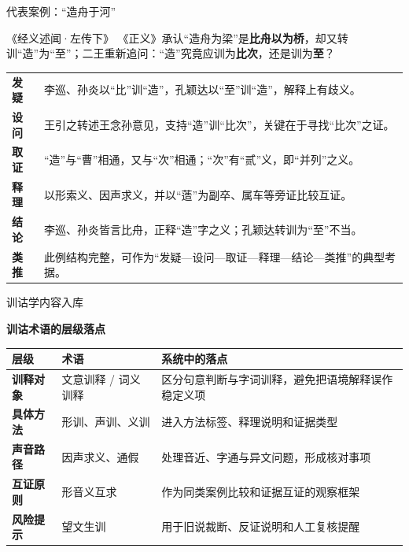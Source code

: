 \documentclass[aspectratio=169]{beamer}
\newcommand{\key}[1]{\textcolor{rucRed}{\textbf{#1}}}
\begin{document}
\begin{frame}{代表案例：“造舟于河”}
    \small
    \begin{block}{《经义述闻·左传下》}
        《正义》承认“造舟为梁”是\key{比舟以为桥}，却又转训“造”为“至”；二王重新追问：“造”究竟应训为\key{比次}，还是训为\key{至}？
    \end{block}

    \vspace{0.15cm}

    {
    \renewcommand{\arraystretch}{1.20}
    \begin{tabularx}{\textwidth}{>{\bfseries\arraybackslash}p{} X}
        发疑 & 李巡、孙炎以“比”训“造”，孔颖达以“至”训“造”，解释上有歧义。\\
        设问 & 王引之转述王念孙意见，支持“造”训“比次”，关键在于寻找“比次”之证。\\
        取证 & “造”与“曹”相通，又与“次”相通；“次”有“贰”义，即“并列”之义。\\
        释理 & 以形索义、因声求义，并以“䔏”为副卒、属车等旁证比较互证。\\
        结论 & 李巡、孙炎皆言比舟，正释“造”字之义；孔颖达转训为“至”不当。\\
        类推 & 此例结构完整，可作为“发疑—设问—取证—释理—结论—类推”的典型考据。\\
    \end{tabularx}
    }
\end{frame}

\begin{frame}{训诂学内容入库}
    \begin{center}
        \small\textbf{训诂术语的层级落点}
    \end{center}
    \vspace{-0.24cm}
    \begin{table}[h]
        \centering
        \small
        \begin{tabularx}{0.96\textwidth}{>{\bfseries}p{} p{} X}
            \toprule
            层级 & 术语 & 系统中的落点 \\
            \midrule
            训释对象 & 文意训释 / 词义训释 & 区分句意判断与字词训释，避免把语境解释误作稳定义项 \\
            具体方法 & 形训、声训、义训 & 进入方法标签、释理说明和证据类型 \\
            声音路径 & 因声求义、通假 & 处理音近、字通与异文问题，形成核对事项 \\
            互证原则 & 形音义互求 & 作为同类案例比较和证据互证的观察框架 \\
            风险提示 & 望文生训 & 用于旧说裁断、反证说明和人工复核提醒 \\
            \bottomrule
        \end{tabularx}
    \end{table}
\end{frame}
\end{document}
